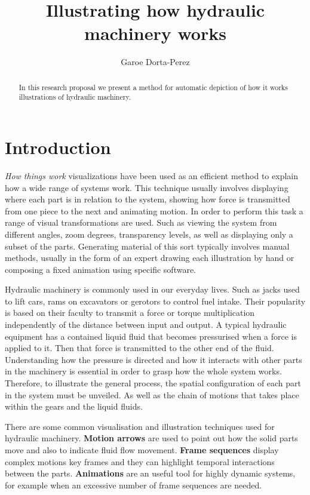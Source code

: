 \documentclass[11pt]{report}
\title{ Illustrating how hydraulic machinery works } \author{Garoe Dorta-Perez}
\begin{document}
\maketitle
\begin{abstract}
In this research proposal we present a method for automatic depiction of how it works illustrations of hydraulic machinery. \end{abstract}


\chapter{Introduction}
\label{ch:intro}

\textit{How things work} visualizations have been used as an efficient method to explain how a wide range of systems work.
This technique usually involves displaying where each part is in relation to the system, showing how force is transmitted from one piece to the next and animating motion. 
In order to perform this task a range of visual transformations are used.
Such as viewing the system from different angles, zoom degrees,  transparency levels, as well as displaying only a subset of the parts.
Generating material of this sort typically involves manual methods, usually in the form of an expert drawing each illustration by hand or composing a fixed animation using specific software.

Hydraulic machinery is commonly used in our everyday lives.
Such as jacks used to lift cars, rams on excavators or gerotors to control fuel intake.
Their popularity is based on their faculty to transmit a force or torque multiplication independently of the distance between input and output.  
A typical hydraulic equipment has a contained liquid fluid that becomes pressurised when a force is applied to it.
Then that force is transmitted to the other end of the fluid. 
Understanding how the pressure is directed and how it interacts with other parts in the machinery is essential in order to grasp how the whole system works. 
Therefore, to illustrate the general process, the spatial configuration of each part in the system must be unveiled.
As well as the chain of motions that takes place within the gears and the liquid fluids.

There are some common visualisation and illustration techniques used for hydraulic machinery.
\textbf{Motion arrows} are used to point out how the solid parts move and also to indicate fluid flow movement.
\textbf{Frame sequences} display complex motions key frames and they can highlight temporal interactions between the parts.
\textbf{Animations} are an useful tool for highly dynamic systems, for example when an excessive number of frame sequences are needed.  
\end{document}
